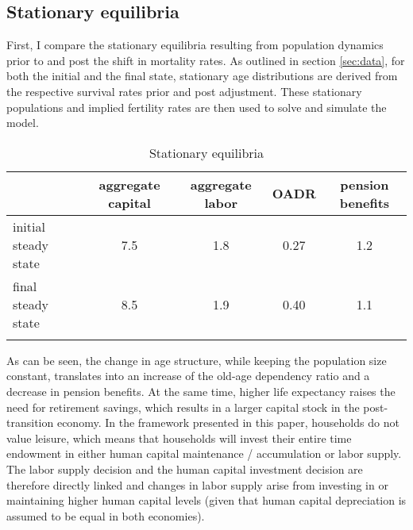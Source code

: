 \subsection{Stationary equilibria}

First, I compare the stationary equilibria resulting from population dynamics prior to and post the shift in mortality rates. As outlined in section \ref{sec:data}, for both the initial and the final state, stationary age distributions are derived from the respective survival rates prior and post adjustment. These stationary populations and implied fertility rates are then used to solve and simulate the model.

\begin{table}[ht]
    \caption{Stationary equilibria}
    \label{tab:stationary_aggregates}
    \centering
    \begin{tabular}{l c c c c}
        \hline \hline
                                &aggregate capital  & aggregate labor   & OADR  & pension benefits \\
        \hline
        initial steady state    &7.5                &1.8                &0.27   &1.2  \\
        final steady state      &8.5                &1.9                &0.40   &1.1  \\
        \hline \hline \\
    \end{tabular}
\end{table}


As can be seen, the change in age structure, while keeping the population size constant, translates into an increase of the old-age dependency ratio and a decrease in pension benefits. At the same time, higher life expectancy raises the need for retirement savings, which results in a larger capital stock in the post-transition economy. In the framework presented in this paper, households do not value leisure, which means that households will invest their entire time endowment in either human capital maintenance / accumulation or labor supply. The labor supply decision and the human capital investment decision are therefore directly linked and changes in labor supply arise from investing in or maintaining higher human capital levels (given that human capital depreciation is assumed to be equal in both economies).